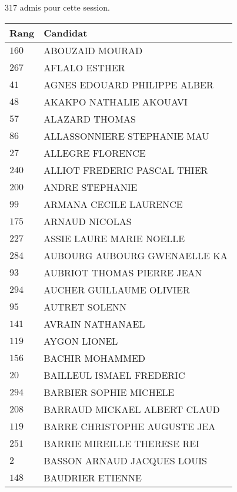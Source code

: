 



  $317$ admis pour cette session.

  \begin{xltabular}{\linewidth}{|l|X|}
    \hline
    \textbf{Rang} & \textbf{Candidat} \\
    \hline
    $160$ & ABOUZAID MOURAD \\
    \hline
    $267$ & AFLALO ESTHER \\
    \hline
    $41$ & AGNES EDOUARD PHILIPPE ALBER \\
    \hline
    $48$ & AKAKPO NATHALIE AKOUAVI \\
    \hline
    $57$ & ALAZARD THOMAS \\
    \hline
    $86$ & ALLASSONNIERE STEPHANIE MAU \\
    \hline
    $27$ & ALLEGRE FLORENCE \\
    \hline
    $240$ & ALLIOT FREDERIC PASCAL THIER \\
    \hline
    $200$ & ANDRE STEPHANIE \\
    \hline
    $99$ & ARMANA CECILE LAURENCE \\
    \hline
    $175$ & ARNAUD NICOLAS \\
    \hline
    $227$ & ASSIE LAURE MARIE NOELLE \\
    \hline
    $284$ & AUBOURG AUBOURG GWENAELLE KA \\
    \hline
    $93$ & AUBRIOT THOMAS PIERRE JEAN \\
    \hline
    $294$ & AUCHER GUILLAUME OLIVIER \\
    \hline
    $95$ & AUTRET SOLENN \\
    \hline
    $141$ & AVRAIN NATHANAEL \\
    \hline
    $119$ & AYGON LIONEL \\
    \hline
    $156$ & BACHIR MOHAMMED \\
    \hline
    $20$ & BAILLEUL ISMAEL FREDERIC \\
    \hline
    $294$ & BARBIER SOPHIE MICHELE \\
    \hline
    $208$ & BARRAUD MICKAEL ALBERT CLAUD \\
    \hline
    $119$ & BARRE CHRISTOPHE AUGUSTE JEA \\
    \hline
    $251$ & BARRIE MIREILLE THERESE REI \\
    \hline
    $2$ & BASSON ARNAUD JACQUES LOUIS \\
    \hline
    $148$ & BAUDRIER ETIENNE \\

\end{xltabular}
